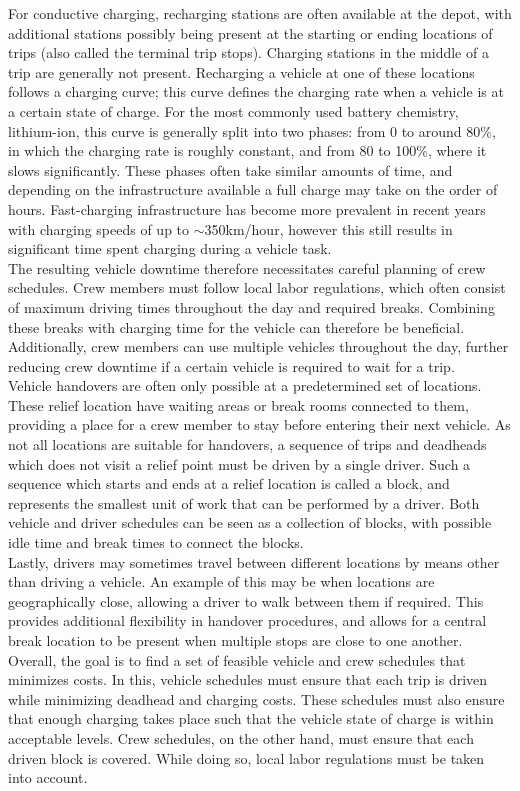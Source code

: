 \documentclass[]{article}
\begin{document}
For conductive charging, recharging stations are often available at the depot, with additional stations possibly being present at the starting or ending locations of trips (also called the terminal trip stops). Charging stations in the middle of a trip are generally not present. Recharging a vehicle at one of these locations follows a charging curve; this curve defines the charging rate when a vehicle is at a certain state of charge. For the most commonly used battery chemistry, lithium-ion, this curve is generally split into two phases: from 0 to around 80\%, in which the charging rate is roughly constant, and from 80 to 100\%, where it slows significantly. These phases often take similar amounts of time, and depending on the infrastructure available a full charge may take on the order of hours. Fast-charging infrastructure has become more prevalent in recent years with charging speeds of up to $\sim$350km/hour, however this still results in significant time spent charging during a vehicle task. \\
The resulting vehicle downtime therefore necessitates careful planning of crew schedules. Crew members must follow local labor regulations, which often consist of maximum driving times throughout the day and required breaks. Combining these breaks with charging time for the vehicle can therefore be beneficial. Additionally, crew members can use multiple vehicles throughout the day, further reducing crew downtime if a certain vehicle is required to wait for a trip. \\
Vehicle handovers are often only possible at a predetermined set of locations. These relief location have waiting areas or break rooms connected to them, providing a place for a crew member to stay before entering their next vehicle. As not all locations are suitable for handovers, a sequence of trips and deadheads which does not visit a relief point must be driven by a single driver. Such a sequence which starts and ends at a relief location is called a block, and represents the smallest unit of work that can be performed by a driver. Both vehicle and driver schedules can be seen as a collection of blocks, with possible idle time and break times to connect the blocks. \\ 
Lastly, drivers may sometimes travel between different locations by means other than driving a vehicle. An example of this may be when locations are geographically close, allowing a driver to walk between them if required. This provides additional flexibility in handover procedures, and allows for a central break location to be present when multiple stops are close to one another. \\
Overall, the goal is to find a set of feasible vehicle and crew schedules that minimizes costs. In this, vehicle schedules must ensure that each trip is driven while minimizing deadhead and charging costs. These schedules must also ensure that enough charging takes place such that the vehicle state of charge is within acceptable levels. Crew schedules, on the other hand, must ensure that each driven block is covered. While doing so, local labor regulations must be taken into account.
\end{document}
